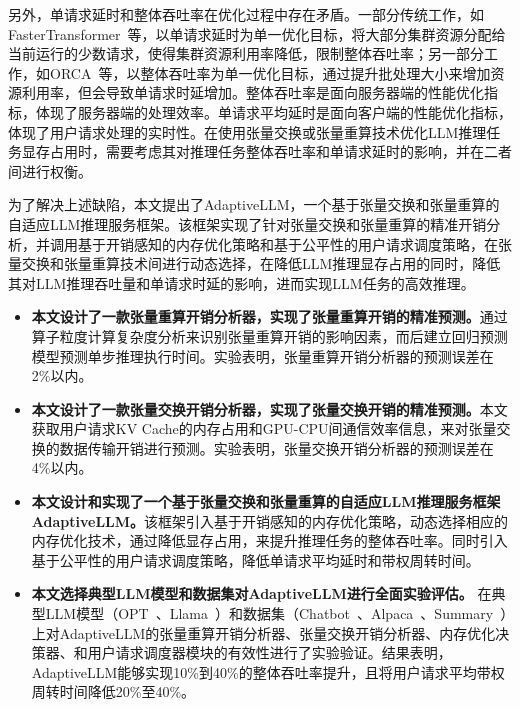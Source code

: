 另外，单请求延时和整体吞吐率在优化过程中存在矛盾。一部分传统工作，如FasterTransformer~\cite{FasterTransformer}等，以单请求延时为单一优化目标，将大部分集群资源分配给当前运行的少数请求，使得集群资源利用率降低，限制整体吞吐率；另一部分工作，如ORCA~\cite{vLLM, ORCA}等，以整体吞吐率为单一优化目标，通过提升批处理大小来增加资源利用率，但会导致单请求时延增加。整体吞吐率是面向服务器端的性能优化指标，体现了服务器端的处理效率。单请求平均延时是面向客户端的性能优化指标，体现了用户请求处理的实时性。在使用张量交换或张量重算技术优化LLM推理任务显存占用时，需要考虑其对推理任务整体吞吐率和单请求延时的影响，并在二者间进行权衡。

为了解决上述缺陷，本文提出了AdaptiveLLM，一个基于张量交换和张量重算的自适应LLM推理服务框架。该框架实现了针对张量交换和张量重算的精准开销分析，并调用基于开销感知的内存优化策略和基于公平性的用户请求调度策略，在张量交换和张量重算技术间进行动态选择，在降低LLM推理显存占用的同时，降低其对LLM推理吞吐量和单请求时延的影响，进而实现LLM任务的高效推理。

\begin{itemize}

    \item \textbf{本文设计了一款张量重算开销分析器，实现了张量重算开销的精准预测。}通过算子粒度计算复杂度分析来识别张量重算开销的影响因素，而后建立回归预测模型预测单步推理执行时间。实验表明，张量重算开销分析器的预测误差在2\%以内。
    
    \item \textbf{本文设计了一款张量交换开销分析器，实现了张量交换开销的精准预测。}本文获取用户请求KV Cache的内存占用和GPU-CPU间通信效率信息，来对张量交换的数据传输开销进行预测。实验表明，张量交换开销分析器的预测误差在4\%以内。

    \item \textbf{本文设计和实现了一个基于张量交换和张量重算的自适应LLM推理服务框架AdaptiveLLM。}该框架引入基于开销感知的内存优化策略，动态选择相应的内存优化技术，通过降低显存占用，来提升推理任务的整体吞吐率。同时引入基于公平性的用户请求调度策略，降低单请求平均延时和带权周转时间。
    
    \item \textbf{本文选择典型LLM模型和数据集对AdaptiveLLM进行全面实验评估。} 在典型LLM模型（OPT~\cite{OPT}、Llama~\cite{Llama}）和数据集（Chatbot~\cite{Chatbot}、Alpaca~\cite{Alpaca}、Summary~\cite{Summary}）上对AdaptiveLLM的张量重算开销分析器、张量交换开销分析器、内存优化决策器、和用户请求调度器模块的有效性进行了实验验证。结果表明，AdaptiveLLM能够实现10\%到40\%的整体吞吐率提升，且将用户请求平均带权周转时间降低20\%至40\%。

\end{itemize}